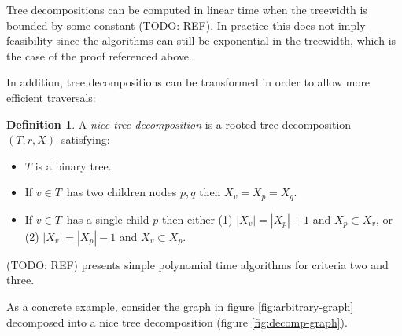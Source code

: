 \documentclass[a4paper,11pt]{report}
\theoremstyle{plain}
\theoremstyle{definition}
\newtheorem{defn}[thm]{Definition} %
\begin{document}
Tree decompositions can be computed in linear time when the treewidth is bounded by some constant (TODO: REF).
In practice this does not imply feasibility since the algorithms can still be exponential in the treewidth, which is the case of the proof referenced above.

In addition, tree decompositions can be transformed in order to allow more efficient traversals:

\begin{defn}
A \emph{nice tree decomposition} is a rooted tree decomposition $(T, r, X)$ satisfying:
\begin{itemize}
\item $T$ is a binary tree.
\item If $v \in T$ has two children nodes $p, q$ then $X_v = X_p = X_q$.
\item If $v \in T$ has a single child $p$ then either
  (1) $|X_v| = |X_p| + 1$ and $X_p \subset X_v$, or (2) $|X_v| = |X_p| - 1$ and $X_v \subset X_p$.
\end{itemize}
\end{defn}

(TODO: REF) presents simple polynomial time algorithms for criteria two and three.


As a concrete example, consider the graph in figure \ref{fig:arbitrary-graph} decomposed into a nice tree decomposition (figure \ref{fig:decomp-graph}).
\end{document}
